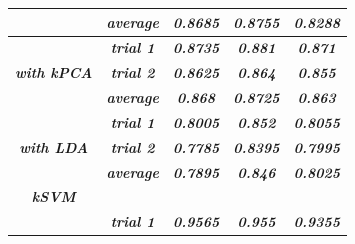 \documentclass{article}
\begin{document}
\begin{table}[!htb]
\begin{tabular}{|c|c|ccc|}
\textit{\textbf{}}                                                                              & \textit{\textbf{average}} & \multicolumn{1}{c|}{\textit{\textbf{0.8685}}}                        & \multicolumn{1}{c|}{\textit{\textbf{0.8755}}} & \textit{\textbf{0.8288}} \\ \hline
\textit{\textbf{}}                                                                              & \textit{\textbf{trial 1}} & \multicolumn{1}{c|}{\textit{\textbf{0.8735}}}                        & \multicolumn{1}{c|}{\textit{\textbf{0.881}}}  & \textit{\textbf{0.871}}  \\ \cline{2-5} 
\textit{\textbf{with kPCA}}                                                                     & \textit{\textbf{trial 2}} & \multicolumn{1}{c|}{\textit{\textbf{0.8625}}}                        & \multicolumn{1}{c|}{\textit{\textbf{0.864}}}  & \textit{\textbf{0.855}}  \\ \cline{2-5} 
\textit{\textbf{}}                                                                              & \textit{\textbf{average}} & \multicolumn{1}{c|}{\textit{\textbf{0.868}}}                         & \multicolumn{1}{c|}{\textit{\textbf{0.8725}}} & \textit{\textbf{0.863}}  \\ \hline
\textit{\textbf{}}                                                                              & \textit{\textbf{trial 1}} & \multicolumn{1}{c|}{\textit{\textbf{0.8005}}}                        & \multicolumn{1}{c|}{\textit{\textbf{0.852}}}  & \textit{\textbf{0.8055}} \\ \cline{2-5} 
\textit{\textbf{with LDA}}                                                                      & \textit{\textbf{trial 2}} & \multicolumn{1}{c|}{\textit{\textbf{0.7785}}}                        & \multicolumn{1}{c|}{\textit{\textbf{0.8395}}} & \textit{\textbf{0.7995}} \\ \cline{2-5} 
\textit{\textbf{}}                                                                              & \textit{\textbf{average}} & \multicolumn{1}{c|}{\textit{\textbf{0.7895}}}                        & \multicolumn{1}{c|}{\textit{\textbf{0.846}}}  & \textit{\textbf{0.8025}} \\ \hline
\textit{\textbf{kSVM}}                                                                          & \textit{\textbf{}}        & \multicolumn{1}{c|}{\textit{\textbf{}}}                              & \multicolumn{1}{c|}{\textit{\textbf{}}}       & \textit{\textbf{}}       \\ \hline
                                                                                                & \textit{\textbf{trial 1}} & \multicolumn{1}{c|}{\textit{\textbf{0.9565}}}                        & \multicolumn{1}{c|}{\textit{\textbf{0.955}}}  & \textit{\textbf{0.9355}} \\ \cline{2-5} 

\end{tabular}
\end{table}
\end{document}
